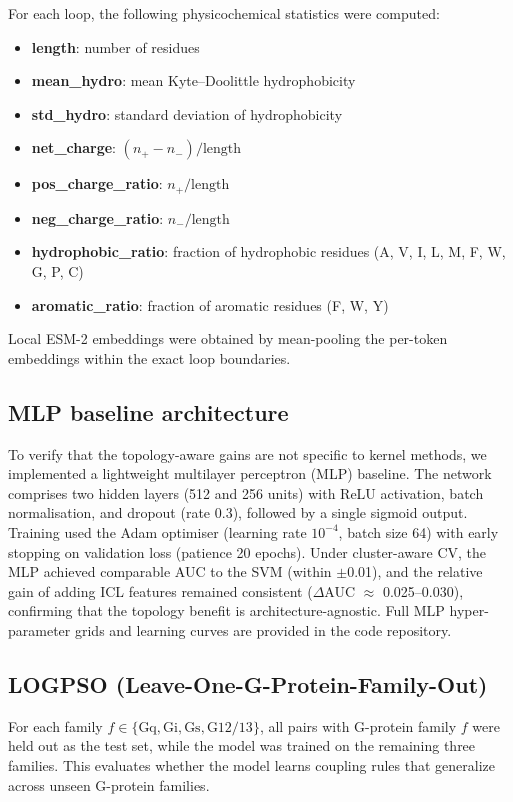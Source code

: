 \documentclass[11pt,a4paper]{article}
\begin{document}
For each loop, the following physicochemical statistics were computed:
\begin{itemize}
    \item \textbf{length}: number of residues
    \item \textbf{mean\_hydro}: mean Kyte--Doolittle hydrophobicity
    \item \textbf{std\_hydro}: standard deviation of hydrophobicity
    \item \textbf{net\_charge}: $(n_+ - n_-) / \text{length}$
    \item \textbf{pos\_charge\_ratio}: $n_+ / \text{length}$
    \item \textbf{neg\_charge\_ratio}: $n_- / \text{length}$
    \item \textbf{hydrophobic\_ratio}: fraction of hydrophobic residues (A, V, I, L, M, F, W, G, P, C)
    \item \textbf{aromatic\_ratio}: fraction of aromatic residues (F, W, Y)
\end{itemize}

Local ESM-2 embeddings were obtained by mean-pooling the per-token embeddings within the exact loop boundaries.

\subsection{MLP baseline architecture}

To verify that the topology-aware gains are not specific to kernel methods, we implemented a lightweight multilayer perceptron (MLP) baseline. The network comprises two hidden layers (512 and 256 units) with ReLU activation, batch normalisation, and dropout (rate 0.3), followed by a single sigmoid output. Training used the Adam optimiser (learning rate $10^{-4}$, batch size 64) with early stopping on validation loss (patience 20 epochs). Under cluster-aware CV, the MLP achieved comparable AUC to the SVM (within $\pm$0.01), and the relative gain of adding ICL features remained consistent ($\Delta$AUC $\approx$ 0.025--0.030), confirming that the topology benefit is architecture-agnostic. Full MLP hyper-parameter grids and learning curves are provided in the code repository.

\subsection{LOGPSO (Leave-One-G-Protein-Family-Out)}

For each family $f \in \{\text{Gq}, \text{Gi}, \text{Gs}, \text{G12/13}\}$, all pairs with G-protein family $f$ were held out as the test set, while the model was trained on the remaining three families. This evaluates whether the model learns coupling rules that generalize across unseen G-protein families.
\end{document}
